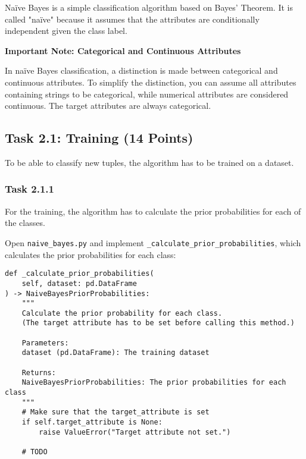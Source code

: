\documentclass[
english,
smallborders
]{i6prcsht}
\newcommand{\points}[1]{\hfill \color{red}(#1 Points)\color{black}}
\begin{document}
Naïve Bayes is a simple classification algorithm based on Bayes' Theorem. It is called "naïve" because it assumes that the attributes are conditionally independent given the class label.

\vspace*{1mm}

\begin{mdframed}
	\begin{em}
		\textbf{Important Note: Categorical and Continuous Attributes}
		
		In naïve Bayes classification, a distinction is made between categorical and continuous attributes. To simplify the distinction, you can assume all attributes containing strings to be categorical, while numerical attributes are considered continuous. The target attributes are always categorical.
	\end{em}
\end{mdframed}

\subsection*{Task 2.1: Training \points{14}}

To be able to classify new tuples, the algorithm has to be trained on a dataset.

\subsubsection*{Task 2.1.1}

For the training, the algorithm has to calculate the prior probabilities for each of the classes.

Open \texttt{naive\_bayes.py} and implement \texttt{\_calculate\_prior\_probabilities}, which calculates the prior probabilities for each class:

\vspace*{0.3cm}

\begin{lstlisting}
def _calculate_prior_probabilities(
	self, dataset: pd.DataFrame
) -> NaiveBayesPriorProbabilities:
	"""
	Calculate the prior probability for each class.
	(The target attribute has to be set before calling this method.)

	Parameters:
	dataset (pd.DataFrame): The training dataset

	Returns:
	NaiveBayesPriorProbabilities: The prior probabilities for each class
	"""
	# Make sure that the target_attribute is set
	if self.target_attribute is None:
		raise ValueError("Target attribute not set.")

	# TODO
\end{lstlisting}
\end{document}
